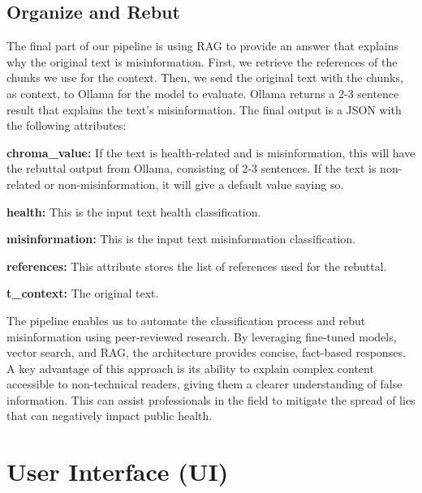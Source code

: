 \subsection{Organize and Rebut}
The final part of our pipeline is using RAG to provide an answer that explains why the original text is misinformation. First, we retrieve the references of the chunks we use for the context. Then, we send the original text with the chunks, as context, to Ollama for
the model to evaluate. Ollama returns a 2-3 sentence result that explains the text’s misinformation. The final output is a JSON with the following attributes:

\begin{description}
\item{\textbf{chroma\_value:}} If the text is health-related and is misinformation, this will have the rebuttal output from Ollama, consisting of 2-3 sentences. If the text is non-related or non-misinformation, it will give a default value saying so. 
\item{\textbf{health:}} This is the input text health classification.
\item{\textbf{misinformation:}} This is the input text misinformation classification.
\item{\textbf{references:}} This attribute stores the list of references used for the rebuttal. 
\item{\textbf{t\_context:}} The original text.

\end{description}

The pipeline enables us to automate the classification process and rebut misinformation using peer-reviewed research. By leveraging fine-tuned models, vector search, and RAG, the architecture provides concise, fact-based responses. A key advantage of this
approach is its ability to explain complex content accessible to non-technical readers, giving them a clearer understanding of false information. This can assist professionals in the field to mitigate the spread of lies that can negatively impact public health.


\section{User Interface (UI)}





